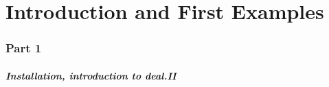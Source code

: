 \part{Introduction and First Examples}
\section*{Part 1}
\begin{frame}
  \frametitle{Installation, introduction to deal.II}
  \tableofcontents[hideallsubsections]
\end{frame}




%






%

